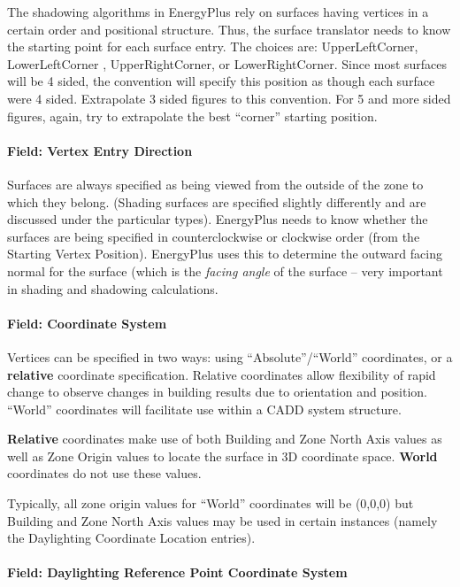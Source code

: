 The shadowing algorithms in EnergyPlus rely on surfaces having vertices in a certain order and positional structure. Thus, the surface translator needs to know the starting point for each surface entry. The choices are: UpperLeftCorner, LowerLeftCorner , UpperRightCorner, or LowerRightCorner. Since most surfaces will be 4 sided, the convention will specify this position as though each surface were 4 sided. Extrapolate 3 sided figures to this convention. For 5 and more sided figures, again, try to extrapolate the best ``corner'' starting position.

\paragraph{Field: Vertex Entry Direction}\label{field-vertex-entry-direction}

Surfaces are always specified as being viewed from the outside of the zone to which they belong. (Shading surfaces are specified slightly differently and are discussed under the particular types). EnergyPlus needs to know whether the surfaces are being specified in counterclockwise or clockwise order (from the Starting Vertex Position). EnergyPlus uses this to determine the outward facing normal for the surface (which is the \emph{facing angle} of the surface -- very important in shading and shadowing calculations.

\paragraph{Field: Coordinate System}\label{field-coordinate-system}

Vertices can be specified in two ways: using ``Absolute''/``World'' coordinates, or a \textbf{relative} coordinate specification. Relative coordinates allow flexibility of rapid change to observe changes in building results due to orientation and position. ``World'' coordinates will facilitate use within a CADD system structure.

\textbf{Relative} coordinates make use of both Building and Zone North Axis values as well as Zone Origin values to locate the surface in 3D coordinate space. \textbf{World} coordinates do not use these values.

Typically, all zone origin values for ``World'' coordinates will be (0,0,0) but Building and Zone North Axis values may be used in certain instances (namely the Daylighting Coordinate Location entries).

\paragraph{Field: Daylighting Reference Point Coordinate System}\label{field-daylighting-reference-point-coordinate-system}

